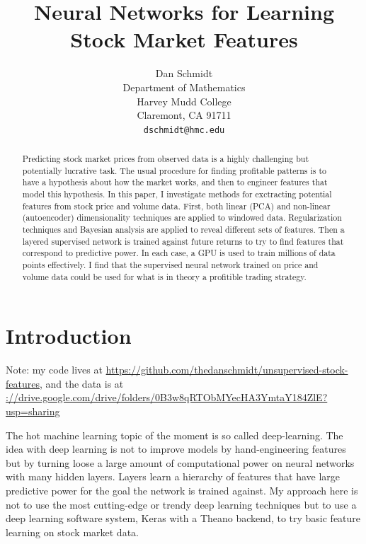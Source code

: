 \documentclass{article}
\title{Neural Networks for Learning Stock Market Features}
\author{
  Dan Schmidt \\
  Department of Mathematics\\
  Harvey Mudd College\\
  Claremont, CA 91711 \\
  \texttt{dschmidt@hmc.edu} \\
}
\begin{document}
\maketitle

\begin{abstract}
    Predicting stock market prices from observed data is a highly challenging
    but potentially lucrative task. The usual procedure for finding
    profitable patterns is to have a hypothesis about how the market works,
    and then to engineer features that model this hypothesis. In this paper,
    I investigate methods for exctracting potential features from
    stock price and volume data. First, both linear (PCA) and non-linear
    (autoencoder) dimensionality techniques are applied to windowed data.
    Regularization techniques and Bayesian analysis are applied to
    reveal different sets of features.
    Then a layered supervised network is trained against future returns 
    to try to find features that correspond to predictive power. In each
    case, a GPU is used to train millions of data points effectively. I
    find that the supervised neural network trained on price and volume
    data could be used for what is in theory a profitible trading strategy. 
\end{abstract}

\section{Introduction}

Note: my code lives at \url{https://github.com/thedanschmidt/unsupervised-stock-features},
and the data is at \url{://drive.google.com/drive/folders/0B3w8qRTObMYecHA3YmtaY184ZlE?usp=sharing} 

The hot machine learning topic of the moment is so called deep-learning. The
idea with deep learning is not to improve models by hand-engineering features
but by turning loose a large amount of computational power on neural networks
with many hidden layers. Layers learn a hierarchy of 
features that have large predictive power for the goal the network is trained
against. My approach here is not to use the most cutting-edge or trendy
deep learning techniques but to use a deep learning software system, Keras 
with a Theano backend, to try basic feature learning on stock market data. 
\end{document}
